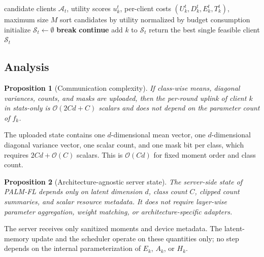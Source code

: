 \documentclass[10pt,journal]{IEEEtran}
\newcommand{\statsonly}{stats-only}
\newtheorem{proposition}{Proposition}
\begin{document}
\begin{algorithm}[t]
\caption{Budget-aware client selection}
\label{alg:scheduler}
\begin{algorithmic}[1]
\Require candidate clients $\mathcal{A}_t$, utility scores $u_k^t$, per-client costs $(U_k^t,D_k^t,E_k^t,T_k^t)$, maximum size $M$
\State sort candidates by utility normalized by budget consumption
\State initialize $\mathcal{S}_t\leftarrow\emptyset$
        \State \textbf{break}
    \EndIf
        \State \textbf{continue}
    \EndIf
    \State add $k$ to $\mathcal{S}_t$
\EndFor
{}
    \State return the best single feasible client
\EndIf
\State \Return $\mathcal{S}_t$
\end{algorithmic}
\end{algorithm}

\subsection{Analysis}
\begin{proposition}[Communication complexity]
If class-wise means, diagonal variances, counts, and masks are uploaded, then the per-round uplink of client $k$ in \statsonly{} is $\mathcal{O}(2Cd+C)$ scalars and does not depend on the parameter count of $f_k$.
\end{proposition}
\begin{IEEEproof}
The uploaded state contains one $d$-dimensional mean vector, one $d$-dimensional diagonal variance vector, one scalar count, and one mask bit per class, which requires $2Cd+\mathcal{O}(C)$ scalars. This is $\mathcal{O}(Cd)$ for fixed moment order and class count.
\end{IEEEproof}

\begin{proposition}[Architecture-agnostic server state]
The server-side state of PALM-FL depends only on latent dimension $d$, class count $C$, clipped count summaries, and scalar resource metadata. It does not require layer-wise parameter aggregation, weight matching, or architecture-specific adapters.
\end{proposition}
\begin{IEEEproof}
The server receives only sanitized moments and device metadata. The latent-memory update and the scheduler operate on these quantities only; no step depends on the internal parameterization of $E_k$, $A_k$, or $H_k$.
\end{IEEEproof}
\end{document}
